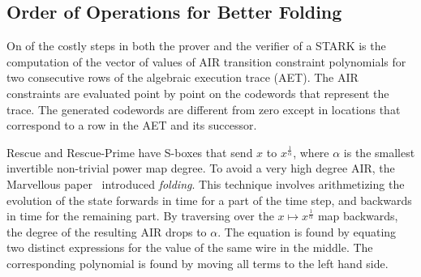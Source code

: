 \documentclass[a4paper]{article}
\begin{document}
\subsection{Order of Operations for Better Folding}

On of the costly steps in both the prover and the verifier of a STARK is the computation of the vector of values of AIR transition constraint polynomials for two consecutive rows of the algebraic execution trace (AET). The AIR constraints are evaluated point by point on the codewords that represent the trace. The generated codewords are different from zero except in locations that correspond to a row in the AET and its successor.

Rescue and Rescue-Prime have S-boxes that send $x$ to $x^{\frac{1}{\alpha}}$, where $\alpha$ is the smallest invertible non-trivial power map degree. To avoid a very high degree AIR, the Marvellous paper~\cite{cryptoeprint:2019/426} introduced \emph{folding}. This technique involves arithmetizing the evolution of the state forwards in time for a part of the time step, and backwards in time for the remaining part. By traversing over the $x \mapsto x^{\frac{1}{\alpha}}$ map backwards, the degree of the resulting AIR drops to $\alpha$. The equation is found by equating two distinct expressions for the value of the same wire in the middle. The corresponding polynomial is found by moving all terms to the left hand side.
\end{document}
